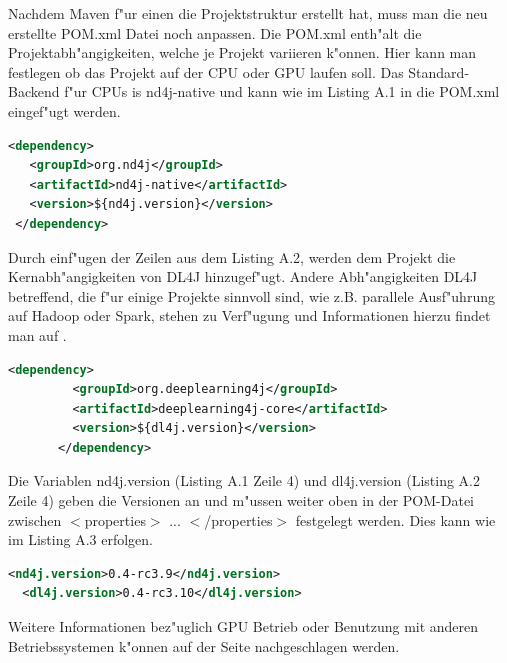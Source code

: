 {Nachdem Maven f"ur einen die Projektstruktur erstellt hat, muss man die neu erstellte POM.xml Datei noch anpassen. Die POM.xml enth"alt die Projektabh"angigkeiten, welche je Projekt variieren k"onnen. Hier kann man festlegen ob das Projekt auf der CPU oder GPU laufen soll.
Das Standard-Backend f"ur CPUs is \glqq nd4j-native\grqq{} und kann wie im Listing A.1  in die POM.xml eingef"ugt werden.
\lstset{language=XML}
\begin{lstlisting}[language=XML,caption=applicationContext.xml]
 <dependency>
   <groupId>org.nd4j</groupId>
   <artifactId>nd4j-native</artifactId>
   <version>${nd4j.version}</version>
 </dependency>
\end{lstlisting}

Durch einf"ugen der Zeilen aus dem Listing A.2, werden dem Projekt die Kernabh"angigkeiten von DL4J hinzugef"ugt. Andere Abh"angigkeiten DL4J betreffend, die f"ur einige Projekte sinnvoll sind, wie z.B. parallele Ausf"uhrung auf Hadoop oder Spark, stehen zu Verf"ugung und Informationen hierzu findet man auf \cite{ND4J}.
\begin{lstlisting}[language=XML,caption=applicationContext.xml]
	   <dependency>
	     <groupId>org.deeplearning4j</groupId>
	     <artifactId>deeplearning4j-core</artifactId>
	     <version>${dl4j.version}</version>
	   </dependency>
\end{lstlisting}

Die Variablen \glqq nd4j.version\grqq{} (Listing A.1 Zeile 4) und \glqq dl4j.version\grqq{} (Listing A.2 Zeile 4) geben die Versionen an und m"ussen weiter oben in der POM-Datei zwischen $<$properties$>$ ... $<$/properties$>$ festgelegt werden. Dies kann wie im Listing A.3 erfolgen.
\begin{lstlisting}[language=XML,caption=applicationContext.xml]
  <nd4j.version>0.4-rc3.9</nd4j.version>
  <dl4j.version>0.4-rc3.10</dl4j.version>
\end{lstlisting}

Weitere Informationen bez"uglich GPU Betrieb oder Benutzung mit anderen Betriebssystemen k"onnen auf der \cite{ND4J} Seite nachgeschlagen werden.
}